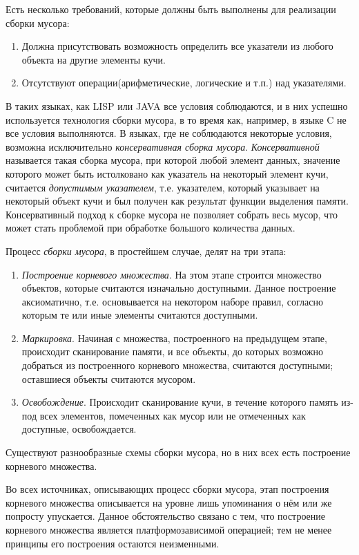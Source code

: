 \documentclass{matmex-diploma}
\begin{document}
Есть несколько требований, которые должны быть выполнены для реализации сборки мусора:
\begin{enumerate}
\item Должна присутствовать возможность определить все указатели из любого объекта на другие элементы кучи.
\item Отсутствуют операции(арифметические, логические и т.п.) над указателями.
\end{enumerate}
В таких языках, как LISP или JAVA все условия соблюдаются, и в них успешно используется технология сборки мусора, в то время как, например, в языке C не все условия выполняются. В языках, где не соблюдаются некоторые условия, возможна исключительно \textit{консервативная сборка мусора}. \textit{Консервативной} называется такая сборка мусора, при которой любой элемент данных, значение которого может быть истолковано как указатель на некоторый элемент кучи, считается  \textit{допустимым указателем}, т.е. указателем, который указывает на некоторый объект кучи и был получен как результат функции выделения памяти. Консервативный подход к сборке мусора не позволяет собрать весь мусор, что может стать проблемой при обработке большого количества данных.

Процесс \textit{сборки мусора}, в простейшем случае, делят на три этапа:
\begin{enumerate}
\item \textit{Построение корневого множества}. На этом этапе строится множество объектов, которые считаются изначально доступными. Данное построение аксиоматично, т.е. основывается на некотором наборе правил, согласно которым те или иные элементы считаются доступными.
\item \textit{Маркировка}. Начиная с множества, построенного на предыдущем этапе, происходит сканирование памяти, и все объекты, до которых возможно добраться из построенного корневого множества, считаются доступными; оставшиеся объекты считаются мусором.
\item \textit{Освобождение}. Происходит сканирование кучи, в течение которого память из-под всех элементов, помеченных как мусор или не отмеченных как доступные, освобождается.
\end{enumerate}

Существуют разнообразные схемы сборки мусора, но в них всех есть построение корневого множества.

Во всех источниках, описывающих процесс сборки мусора, этап построения корневого множества описывается на уровне лишь упоминания о нём или же попросту упускается. Данное обстоятельство связано с тем, что построение корневого множества является платформозависимой операцией; тем не менее принципы его построения остаются неизменными.
\end{document}
